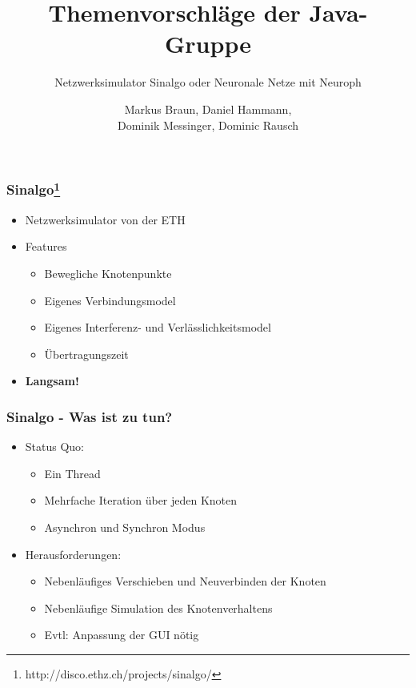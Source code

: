 \documentclass[24pt]{beamer}
\title{Themenvorschläge der Java-Gruppe}
\subtitle{Netzwerksimulator Sinalgo oder Neuronale Netze mit Neuroph}
\author{Markus Braun, Daniel Hammann,\\ 
	Dominik Messinger, Dominic Rausch}
\begin{document}
	\maketitle

	\begin{frame}[c]\frametitle{Sinalgo\footnote{http://disco.ethz.ch/projects/sinalgo/} }
		\begin{itemize}
			\item Netzwerksimulator von der ETH
			\item Features
			\begin{itemize}
				\item Bewegliche Knotenpunkte
				\item Eigenes Verbindungsmodel
				\item Eigenes Interferenz- und Verlässlichkeitsmodel
				\item Übertragungszeit
			\end{itemize}
			\item \textbf{Langsam!}
		\end{itemize}
	\end{frame}

	\begin{frame}[c]\frametitle{Sinalgo - Was ist zu tun?}
		\begin{itemize}
			\item Status Quo:
		    \begin{itemize}
		    	\item Ein Thread
		    	\item Mehrfache Iteration über jeden Knoten
		    	\item Asynchron und Synchron Modus
		    \end{itemize}
		    \item Herausforderungen:
		    \begin{itemize}
		    	\item Nebenläufiges Verschieben und Neuverbinden der Knoten
		    	\item Nebenläufige Simulation des Knotenverhaltens
		    	\item Evtl: Anpassung der GUI nötig
		    \end{itemize}
		\end{itemize}
	\end{frame}
	
\end{document}
